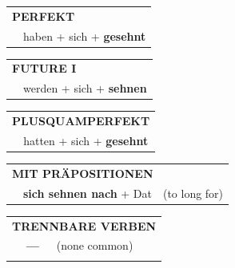 \documentclass[10pt,a4paper]{revtex4-2}
\begin{document}
\begin{verbbox}
 \begin{tabular}{rl}
     \multicolumn{2}{l}{\textbf{PERFEKT}}\\
   & haben + sich + \textbf{gesehnt}\\
  \end{tabular}
\hfill
   \begin{tabular}{rl}
    \multicolumn{2}{l}{\textbf{FUTURE I} }\\
   & werden + sich + \textbf{sehnen}\\
  \end{tabular}
\hfill
   \begin{tabular}{rl}
      \multicolumn{2}{l}{\textbf{PLUSQUAMPERFEKT}}\\
   & hatten + sich + \textbf{gesehnt}\\
  \end{tabular}

   \vspace{10pt}

   \begin{tabular}{lll}
      \multicolumn{3}{l}{\textbf{MIT PRÄPOSITIONEN}}\\
& \textbf{sich sehnen nach} + Dat & (to long for)\\
\end{tabular}
  \hfill
   \begin{tabular}{lll}
      \multicolumn{3}{l}{\textbf{TRENNBARE VERBEN}}\\
 & \textbf{---} & (none common)\\
\vspace{10pt}
  \end{tabular}

  \vspace{-5pt}

\end{verbbox}
\end{document}
